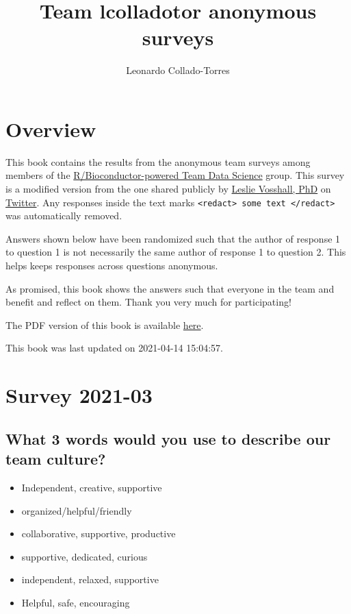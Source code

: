 \documentclass[
]{book}
\title{Team lcolladotor anonymous surveys}
\author{Leonardo Collado-Torres}
\date{}
\providecommand{\tightlist}{%
  \setlength{\itemsep}{0pt}\setlength{\parskip}{0pt}}
\begin{document}
\maketitle

{
\setcounter{tocdepth}{1}
\tableofcontents
}
\hypertarget{overview}{%
\chapter*{Overview}\label{overview}}

This book contains the results from the anonymous team surveys among members of the \href{https://lcolladotor.github.io/bioc_team_ds/}{R/Bioconductor-powered Team Data Science} group. This survey is a modified version from the one shared publicly by \href{https://twitter.com/leslievosshall}{Leslie Vosshall, PhD} on \href{https://twitter.com/leslievosshall/status/1371260850657460227?s=20}{Twitter}. Any responses inside the text marks \texttt{\textless{}redact\textgreater{}\ some\ text\ \textless{}/redact\textgreater{}} was automatically removed.

Answers shown below have been randomized such that the author of response 1 to question 1 is not necessarily the same author of response 1 to question 2. This helps keeps responses across questions anonymous.

As promised, this book shows the answers such that everyone in the team and benefit and reflect on them. Thank you very much for participating!

The PDF version of this book is available \href{_main.pdf}{here}.

This book was last updated on 2021-04-14 15:04:57.

\hypertarget{survey-2021-03}{%
\chapter{Survey 2021-03}\label{survey-2021-03}}

\hypertarget{what-3-words-would-you-use-to-describe-our-team-culture}{%
\section{What 3 words would you use to describe our team culture?}\label{what-3-words-would-you-use-to-describe-our-team-culture}}

\begin{itemize}
\tightlist
\item
  Independent, creative, supportive
\item
  organized/helpful/friendly
\item
  collaborative, supportive, productive
\item
  supportive, dedicated, curious
\item
  independent, relaxed, supportive
\item
  Helpful, safe, encouraging
\end{itemize}
\end{document}
